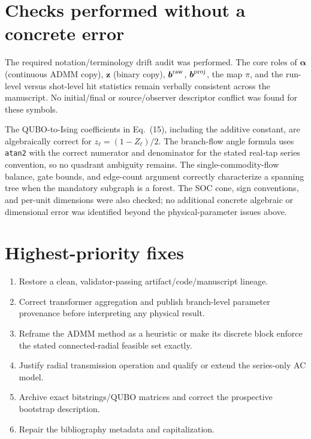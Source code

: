 \documentclass[11pt]{article}
\begin{document}
\section*{Checks performed without a concrete error}

The required notation/terminology drift audit was performed.  The core roles
of $\boldsymbol\alpha$ (continuous ADMM copy), $\boldsymbol z$ (binary copy),
$\boldsymbol b^{\rm raw}$, $\boldsymbol b^{\rm proj}$, the map $\pi$, and the
run-level versus shot-level hit statistics remain verbally consistent across
the manuscript.  No initial/final or source/observer descriptor conflict was
found for these symbols.

The QUBO-to-Ising coefficients in Eq.~(15), including the additive constant,
are algebraically correct for $z_\ell=(1-Z_\ell)/2$.  The branch-flow angle
formula uses \texttt{atan2} with the correct numerator and denominator for the
stated real-tap series convention, so no quadrant ambiguity remains.  The
single-commodity-flow balance, gate bounds, and edge-count argument correctly
characterize a spanning tree when the mandatory subgraph is a forest.  The
SOC cone, sign conventions, and per-unit dimensions were also checked; no
additional concrete algebraic or dimensional error was identified beyond the
physical-parameter issues above.

\section*{Highest-priority fixes}

\begin{enumerate}
  \item Restore a clean, validator-passing artifact/code/manuscript lineage.
  \item Correct transformer aggregation and publish branch-level parameter
  provenance before interpreting any physical result.
  \item Reframe the ADMM method as a heuristic or make its discrete block
  enforce the stated connected-radial feasible set exactly.
  \item Justify radial transmission operation and qualify or extend the
  series-only AC model.
  \item Archive exact bitstrings/QUBO matrices and correct the prospective
  bootstrap description.
  \item Repair the bibliography metadata and capitalization.
\end{enumerate}
\end{document}
